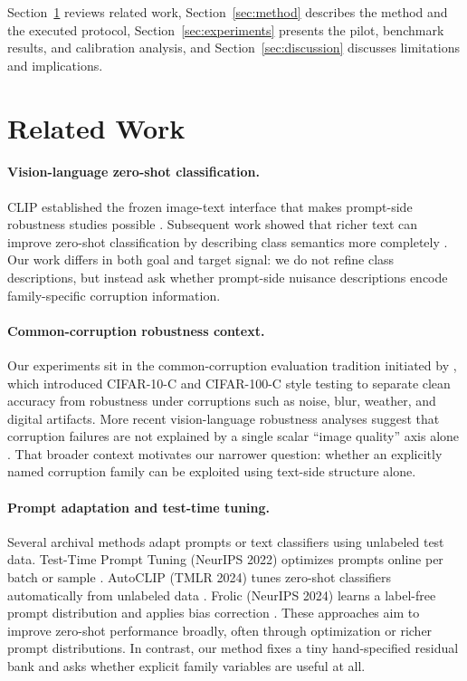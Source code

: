 \documentclass{article}
\begin{document}
Section~\ref{sec:related} reviews related work, Section~\ref{sec:method} describes the method and the executed protocol, Section~\ref{sec:experiments} presents the pilot, benchmark results, and calibration analysis, and Section~\ref{sec:discussion} discusses limitations and implications.

\section{Related Work}
\label{sec:related}

\paragraph{Vision-language zero-shot classification.}
CLIP established the frozen image-text interface that makes prompt-side robustness studies possible \citep{radford2021learning}. Subsequent work showed that richer text can improve zero-shot classification by describing class semantics more completely \citep{menon2022visual}. Our work differs in both goal and target signal: we do not refine class descriptions, but instead ask whether prompt-side nuisance descriptions encode family-specific corruption information.

\paragraph{Common-corruption robustness context.}
Our experiments sit in the common-corruption evaluation tradition initiated by \citet{hendrycks2019benchmarking}, which introduced CIFAR-10-C and CIFAR-100-C style testing to separate clean accuracy from robustness under corruptions such as noise, blur, weather, and digital artifacts. More recent vision-language robustness analyses suggest that corruption failures are not explained by a single scalar ``image quality'' axis alone \citep{usama2025analysing}. That broader context motivates our narrower question: whether an explicitly named corruption family can be exploited using text-side structure alone.

\paragraph{Prompt adaptation and test-time tuning.}
Several archival methods adapt prompts or text classifiers using unlabeled test data. Test-Time Prompt Tuning (NeurIPS 2022) optimizes prompts online per batch or sample \citep{shu2022test}. AutoCLIP (TMLR 2024) tunes zero-shot classifiers automatically from unlabeled data \citep{metzen2023autoclip}. Frolic (NeurIPS 2024) learns a label-free prompt distribution and applies bias correction \citep{zhu2024frolic}. These approaches aim to improve zero-shot performance broadly, often through optimization or richer prompt distributions. In contrast, our method fixes a tiny hand-specified residual bank and asks whether explicit family variables are useful at all.
\end{document}
